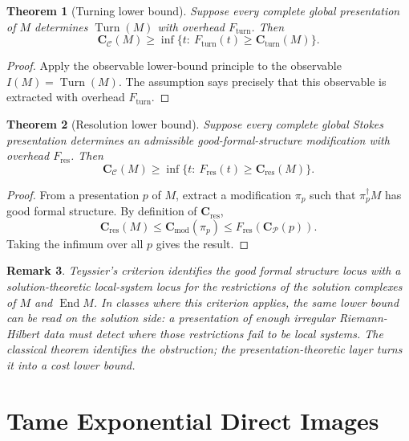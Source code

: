 \documentclass[11pt]{article}
\newtheorem{theorem}{Theorem}[section]
\newtheorem{remark}[theorem]{Remark}
\begin{document}
\begin{theorem}[Turning lower bound]
Suppose every complete global presentation of \(M\) determines \(\operatorname{Turn}(M)\) with overhead \(F_{\operatorname{turn}}\).  Then
\[
\mathbf C_{\mathcal C}(M)
\ge
\inf\{t:\ F_{\operatorname{turn}}(t)\ge
\mathbf C_{\operatorname{turn}}(M)\}.
\]
\end{theorem}

\begin{proof}
Apply the observable lower-bound principle to the observable \(I(M)=\operatorname{Turn}(M)\).  The assumption says precisely that this observable is extracted with overhead \(F_{\operatorname{turn}}\).
\end{proof}

\begin{theorem}[Resolution lower bound]
Suppose every complete global Stokes presentation determines an admissible good-formal-structure modification with overhead \(F_{\operatorname{res}}\).  Then
\[
\mathbf C_{\mathcal C}(M)
\ge
\inf\{t:\ F_{\operatorname{res}}(t)\ge
\mathbf C_{\operatorname{res}}(M)\}.
\]
\end{theorem}

\begin{proof}
From a presentation \(p\) of \(M\), extract a modification \(\pi_p\) such that \(\pi_p^\dagger M\) has good formal structure.  By definition of \(\mathbf C_{\operatorname{res}}\),
\[
\mathbf C_{\operatorname{res}}(M)\le \mathbf C_{\operatorname{mod}}(\pi_p)
\le F_{\operatorname{res}}(\mathbf C_{\mathcal P}(p)).
\]
Taking the infimum over all \(p\) gives the result.
\end{proof}

\begin{remark}
Teyssier's criterion identifies the good formal structure locus with a solution-theoretic local-system locus for the restrictions of the solution complexes of \(M\) and \(\operatorname{End}M\).  In classes where this criterion applies, the same lower bound can be read on the solution side: a presentation of enough irregular Riemann-Hilbert data must detect where those restrictions fail to be local systems.  The classical theorem identifies the obstruction; the presentation-theoretic layer turns it into a cost lower bound.
\end{remark}

\section{Tame Exponential Direct Images}
\end{document}
